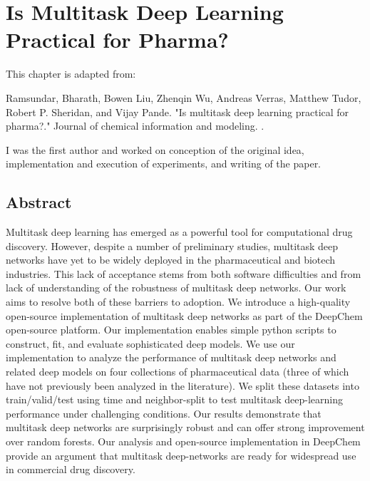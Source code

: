 \section{Is Multitask Deep Learning Practical for Pharma?}

This chapter is adapted from: 

Ramsundar, Bharath, Bowen Liu, Zhenqin Wu, Andreas Verras, Matthew Tudor, Robert P. Sheridan, and Vijay Pande. "Is multitask deep learning practical for pharma?." Journal of chemical information and modeling. \cite{ramsundar2017multitask}.

I was the first author and worked on conception of the original idea, implementation and execution of experiments, and writing of the paper.



\subsection{Abstract}
Multitask deep learning has emerged as a powerful tool for computational drug discovery. However, despite a number of preliminary studies, multitask deep networks have yet to be widely deployed in the pharmaceutical and biotech industries. This lack of acceptance stems from both software difficulties and from lack of understanding of the robustness of multitask deep networks. Our work aims to resolve both of these barriers to adoption. We introduce a high-quality open-source implementation of multitask deep networks as part of the DeepChem open-source platform. Our implementation enables simple python scripts to construct, fit, and evaluate sophisticated deep models. We use our implementation to analyze the performance of multitask deep networks and related deep models on four collections of pharmaceutical data (three of which have not previously been analyzed in the literature). We split these datasets into train/valid/test using time and neighbor-split to test multitask deep-learning performance under challenging conditions. Our results demonstrate that multitask deep networks are surprisingly robust and can offer strong improvement over random forests. Our analysis and open-source implementation in DeepChem provide an argument that multitask deep-networks are ready for widespread use in commercial drug discovery. 


